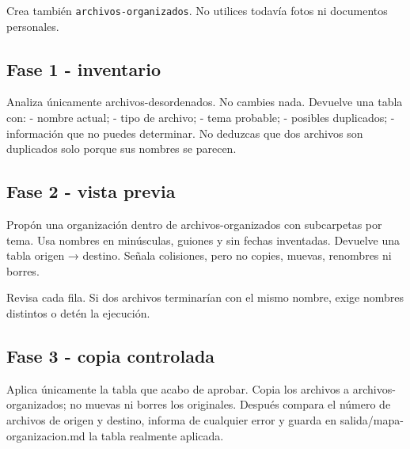 \documentclass[10pt,a4paper,openany]{book}
\newenvironment{Shaded}{}{}
\newcommand{\NormalTok}[1]{#1}
\renewenvironment{Shaded}
  {\begin{tcolorbox}[
    enhanced,
    breakable,
    colback=CodeBg,
    colframe=Border,
    boxrule=0.5pt,
    arc=2mm,
    left=3mm,
    right=3mm,
    top=2.2mm,
    bottom=2.2mm,
    before skip=0.8em,
    after skip=0.9em
  ]}
  {\end{tcolorbox}}
\begin{document}
Crea también \texttt{archivos-organizados}. No utilices todavía fotos ni
documentos personales.

\subsection{Fase 1 - inventario}\label{fase-1---inventario}

\begin{Shaded}
\begin{Highlighting}[]
\NormalTok{Analiza únicamente archivos{-}desordenados. No cambies nada. Devuelve una tabla con:}
\NormalTok{{-} nombre actual;}
\NormalTok{{-} tipo de archivo;}
\NormalTok{{-} tema probable;}
\NormalTok{{-} posibles duplicados;}
\NormalTok{{-} información que no puedes determinar.}
\NormalTok{No deduzcas que dos archivos son duplicados solo porque sus nombres se parecen.}
\end{Highlighting}
\end{Shaded}

\subsection{Fase 2 - vista previa}\label{fase-2---vista-previa}

\begin{Shaded}
\begin{Highlighting}[]
\NormalTok{Propón una organización dentro de archivos{-}organizados con subcarpetas por tema.}
\NormalTok{Usa nombres en minúsculas, guiones y sin fechas inventadas. Devuelve una tabla}
\NormalTok{origen → destino. Señala colisiones, pero no copies, muevas, renombres ni borres.}
\end{Highlighting}
\end{Shaded}

Revisa cada fila. Si dos archivos terminarían con el mismo nombre, exige
nombres distintos o detén la ejecución.

\subsection{Fase 3 - copia controlada}\label{fase-3---copia-controlada}

\begin{Shaded}
\begin{Highlighting}[]
\NormalTok{Aplica únicamente la tabla que acabo de aprobar. Copia los archivos a}
\NormalTok{archivos{-}organizados; no muevas ni borres los originales. Después compara el}
\NormalTok{número de archivos de origen y destino, informa de cualquier error y guarda en}
\NormalTok{salida/mapa{-}organizacion.md la tabla realmente aplicada.}
\end{Highlighting}
\end{Shaded}
\end{document}
